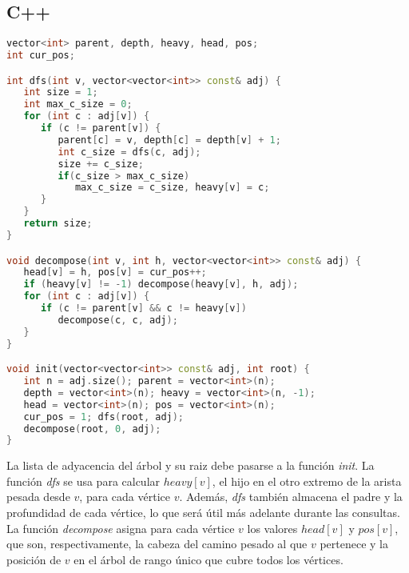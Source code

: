 \subsection{C++}
\begin{lstlisting}[language=C++]
vector<int> parent, depth, heavy, head, pos;
int cur_pos;

int dfs(int v, vector<vector<int>> const& adj) {
   int size = 1;
   int max_c_size = 0;
   for (int c : adj[v]) {
      if (c != parent[v]) {
         parent[c] = v, depth[c] = depth[v] + 1;
         int c_size = dfs(c, adj);
         size += c_size;
         if(c_size > max_c_size)
            max_c_size = c_size, heavy[v] = c;
      }
   }
   return size;
}

void decompose(int v, int h, vector<vector<int>> const& adj) {
   head[v] = h, pos[v] = cur_pos++;
   if (heavy[v] != -1) decompose(heavy[v], h, adj);
   for (int c : adj[v]) {
      if (c != parent[v] && c != heavy[v])
         decompose(c, c, adj);
   }
}

void init(vector<vector<int>> const& adj, int root) {
   int n = adj.size(); parent = vector<int>(n);
   depth = vector<int>(n); heavy = vector<int>(n, -1);
   head = vector<int>(n); pos = vector<int>(n);
   cur_pos = 1; dfs(root, adj);
   decompose(root, 0, adj);
}
\end{lstlisting}

La lista de adyacencia del árbol y su raiz debe pasarse a la función \emph{init}. La función \emph{dfs} se usa para calcular $heavy[v]$, el hijo en el otro extremo de la arista pesada desde $v$, para cada vértice $v$. Además, \emph{dfs} también almacena el padre y la profundidad de cada vértice, lo que será útil más adelante durante las consultas. La función \emph{decompose} asigna para cada vértice $v$ los valores $head[v]$ y $pos[v]$, que son, respectivamente, la cabeza del camino pesado al que $v$ pertenece y la posición de $v$ en el árbol de rango único que cubre todos los vértices.

